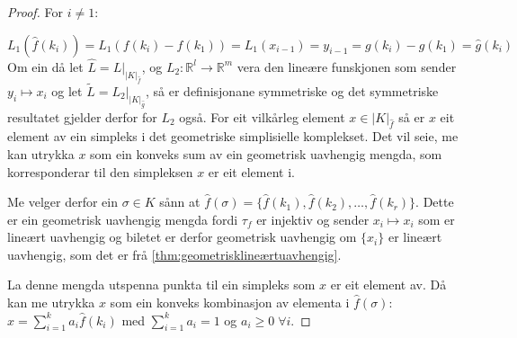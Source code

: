 \documentclass[a4paper, titlepage, 12pt, norsk]{article}
\theoremstyle{plain}
\theoremstyle{definition}
\newcommand{\Rb}{\mathbb{R}}
\newcommand{\gr}[1]{ \lvert #1 \rvert } %
\begin{document}
\begin{theroem}
\begin{proof}
	For $i\neq 1$:

	\begin{equation*}
		L_1(\hat{f}(k_i))=L_1(f(k_i)-f(k_1))=L_1(x_{i-1})=y_{i-1}=g(k_i)-g(k_1)=\hat{g}(k_i)
	\end{equation*}
	Om ein då let $\hat{L}=L|_{\gr{K}_{\hat{f}}}$, og $L_2:\Rb^l\to\Rb^m$ vera den lineære funskjonen som sender $y_i\mapsto x_i$ og let $\tilde{L}=L_2|_{\gr{K}_{\hat{g}}}$, så er definisjonane symmetriske og det symmetriske resultatet gjelder derfor for $L_2$ også. 
	For eit vilkårleg element $x\in\gr{K}_{\hat{f}}$ så er $x$ eit element av ein simpleks i det geometriske simplisielle komplekset. Det vil seie, me kan utrykka $x$ som ein konveks sum av ein geometrisk uavhengig mengda, som korresponderar til den simpleksen $x$ er eit element i.
	
	Me velger derfor ein $\sigma\in K$ sånn at $\hat{f}(\sigma)=\{\hat{f}(k_1), \hat{f}(k_2), \dots, \hat{f}(k_r)\}$. Dette er ein geometrisk uavhengig mengda fordi $\tau_f$ er injektiv og sender $x_i\mapsto x_i$ som er lineært uavhengig og biletet er derfor geometrisk uavhengig om $\{x_i\}$ er lineært uavhengig, som det er frå \autoref{thm:geometrisklineærtuavhengig}.
	
	La denne mengda utspenna punkta til ein simpleks som $x$ er eit element av. Då kan me utrykka $x$ som ein konveks kombinasjon av elementa i $\hat{f}(\sigma)$: $x=\sum_{i=1}^ka_i\hat{f}(k_i)$ med $\sum_{i=1}^ka_i=1$ og $a_i\geq0\; \forall i$. 
	

\end{proof}
\end{theroem}
\end{document}
